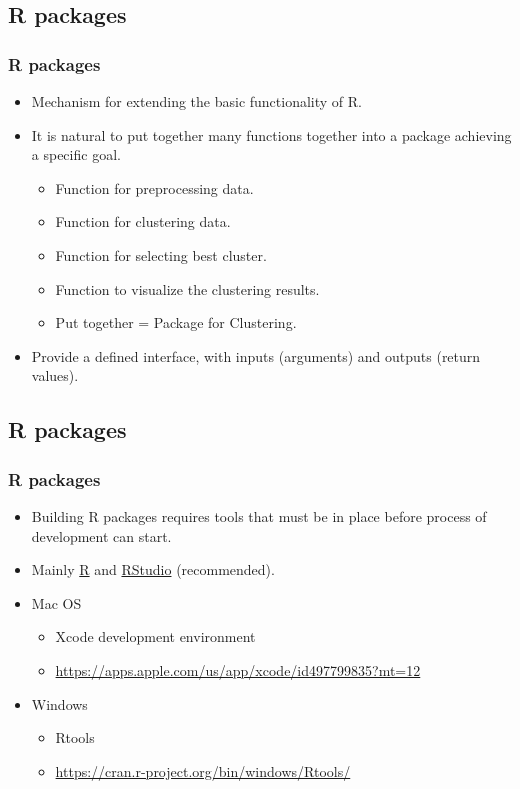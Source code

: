 \documentclass[11pt]{beamer}
\begin{document}
\subsection{R packages}
\begin{frame}
\frametitle{{\sf R} packages}
\begin{itemize}
\item Mechanism for extending the basic functionality of {\sf R}.
\vspace{0.2in}
\item It is natural to put together many functions together into a package achieving a specific goal.
\begin{itemize}
\item Function for preprocessing data. 
\item Function for clustering data.
\item Function for selecting best cluster.
\item Function to visualize the clustering results.
\item Put together = Package for Clustering. 
\end{itemize}
\vspace{0.2in}
\item Provide a defined interface, with inputs (arguments) and outputs (return values).
\end{itemize}
\end{frame}

\subsection{R packages}
\begin{frame}
\frametitle{{\sf R} packages}
\begin{itemize}
\item Building R packages requires tools that must be in place before process of development can start.
\vspace{0.2in}
\item Mainly \href{https://cran.r-project.org/}{R} and \href{https://www.rstudio.com/products/rstudio/download/}{RStudio} (recommended).
\vspace{0.2in}
\item Mac OS
\begin{itemize}
\item Xcode development environment
\item \url{https://apps.apple.com/us/app/xcode/id497799835?mt=12}
\end{itemize} 
\vspace{0.2in}
\item Windows
\begin{itemize}
\item Rtools 
\item \url{https://cran.r-project.org/bin/windows/Rtools/}
\end{itemize} 
\end{itemize}
\end{frame}
\end{document}
